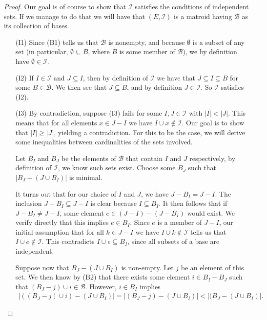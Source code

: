 \begin{proof}
    Our goal is of course to show that $\mathcal{I}$ satisfies the conditions of independent sets. If we manage to do that we will have that $(E, \mathcal{I})$ is a matroid having $\mathcal{B}$ as its collection of bases.
    \begin{enumerate}
      \item[(I1)] Since (B1) tells us that $\mathcal{B}$ is nonempty, and because $\emptyset$ is a subset of any set (in particular, $\emptyset \subseteq B$, where $B$ is some member of $\mathcal{B}$), we by definition have $\emptyset \in \mathcal{I}$.
        
      \item[(I2)] If $I\in\mathcal{I}$ and $J\subseteq I$, then by definition of $\mathcal{I}$ we have that $J\subseteq I\subseteq B$ for some $B\in\mathcal{B}$. We then see that $J\subseteq B$, and by definition  $J\in\mathcal{I}$. So $\mathcal{I}$ satisfies (I2).
        
      \item[(I3)] By contradiction, suppose (I3) fails for some $I,J\in\mathcal{I}$ with $|I|<|J|$. This means that for all elements $x\in J-I$ we have $I\cup x \notin \mathcal{I}$. Our goal is to show that $|I|\geq|J|$, yielding a contradiction. For this to be the case, we will derive some inequalities between cardinalities of the sets involved.
        
        Let $B_I$ and $B_J$ be the elements of $\mathcal{B}$ that contain $I$ and $J$ respectively, by definition of $\mathcal{I}$, we know such sets exist. Choose some $B_J$ such that $|B_J - (J\cup B_I)|$ is minimal. 

        It turns out that for our choice of $I$ and $J$, we have $J-B_I = J-I$. The inclusion $J- B_I \subseteq J - I$ is clear because $I \subseteq B_I$. It then follows that if $J-B_I \neq J-I$, some element $e \in (J-I)-(J-B_I)$ would exist. We verify directly that this implies $e \in B_I$. Since $e$ is a member of $J-I$, our initial assumption that for all $k \in J - I$ we have $I \cup k \notin \mathcal{I}$ tells us that $I\cup e\notin \mathcal{I}$. This contradicts $I\cup e\subseteq B_I$, since all subsets of a base are independent.

        Suppose now that $B_J-(J\cup B_I)$ is non-empty. Let $j$ be an element of this set. We then know by (B2) that there exists some element $i\in B_I-B_J$ such that $(B_J-j)\cup i \in\mathcal{B}$. However, $i \in B_I$ implies 
        \begin{align*}
        |((B_J-j)\cup i)-(J\cup B_I)|=|(B_J-j)-(J\cup B_I)|<|(B_J-(J\cup B_I)|. 
        \end{align*}


\end{enumerate}
\end{proof}
